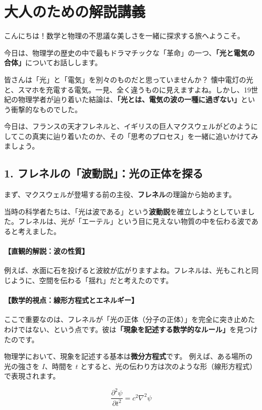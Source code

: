 \documentclass[a4paper,11pt,openany]{ltjsbook}
\begin{document}
\section{大人のための解説講義}
\begin{lecturebox}
こんにちは！数学と物理の不思議な美しさを一緒に探求する旅へようこそ。

今日は、物理学の歴史の中で最もドラマチックな「革命」の一つ、\textbf{「光と電気の合体」}についてお話しします。

皆さんは「光」と「電気」を別々のものだと思っていませんか？ 懐中電灯の光と、スマホを充電する電気。一見、全く違うものに見えますよね。しかし、19世紀の物理学者が辿り着いた結論は、\textbf{「光とは、電気の波の一種に過ぎない」}という衝撃的なものでした。

今日は、フランスの天才フレネルと、イギリスの巨人マクスウェルがどのようにしてこの真実に辿り着いたのか、その「思考のプロセス」を一緒に追いかけてみましょう。

\subsection*{1. フレネルの「波動説」：光の正体を探る}

まず、マクスウェルが登場する前の主役、\textbf{フレネル}の理論から始めます。

当時の科学者たちは、「光は波である」という\textbf{波動説}を確立しようとしていました。フレネルは、光が「エーテル」という目に見えない物質の中を伝わる波であると考えました。

\paragraph{【直観的解説：波の性質】}
例えば、水面に石を投げると波紋が広がりますよね。フレネルは、光もこれと同じように、空間を伝わる「揺れ」だと考えたのです。

\paragraph{【数学的視点：線形方程式とエネルギー】}
ここで重要なのは、フレネルが「光の正体（分子の正体）」を完全に突き止めたわけではない、という点です。彼は\textbf{「現象を記述する数学的なルール」}を見つけたのです。

物理学において、現象を記述する基本は\textbf{微分方程式}です。
例えば、ある場所の光の強さを $I$、時間を $t$ とすると、光の伝わり方は次のような形（線形方程式）で表現されます。

$$\frac{\partial^2 \psi}{\partial t^2} = c^2 \nabla^2 \psi$$


\end{lecturebox}
\end{document}
